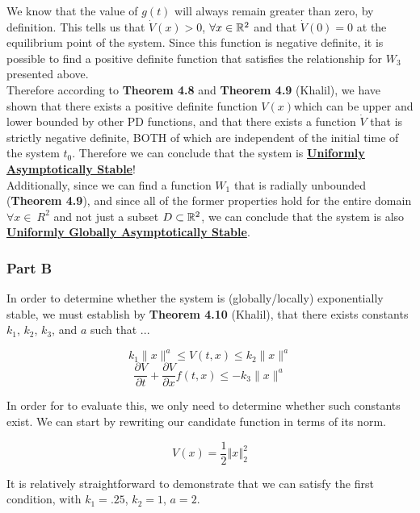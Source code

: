 \noindent We know that the value of $g(t)$ will always remain greater than zero, by definition. This tells us that $\dot{V}(x)>0$, $\forall x \in \mathbb{R}^2 $ and that $\dot{V}(0) = 0$ at the equilibrium point of the system. Since this function is negative definite, it is possible to find a positive definite function that satisfies the relationship for $W_3$ presented above. \\

\noindent Therefore according to \textbf{Theorem 4.8} and \textbf{Theorem 4.9} (Khalil), we have shown that there exists a positive definite function $V(x)$which can be upper and lower bounded by other PD functions, and that there exists a function $\dot{V}$ that is strictly negative definite, BOTH of which are independent of the initial time of the system $t_0$. Therefore we can conclude that the system is \underline{\textbf{Uniformly Asymptotically Stable}}! \\

\noindent Additionally, since we can find a function $W_1$ that is radially unbounded (\textbf{Theorem 4.9}), and since all of the former properties hold for the entire domain $\forall x \in \
R^2$ and not just a subset $D \subset \mathbb{R}^2$, we can conclude that the system is also \underline{\textbf{Uniformly Globally Asymptotically Stable}}.





\subsubsection*{Part B}

In order to determine whether the system is (globally/locally) exponentially stable, we must establish by \textbf{Theorem 4.10} (Khalil), that there exists constants $k_1$, $k_2$, $k_3$, and $a$ such that ...

$$
k_{1}\|x\|^{a} \leq V(t, x) \leq k_{2}\|x\|^{a}
$$
$$
\frac{\partial V}{\partial t}+\frac{\partial V}{\partial x} f(t, x) \leq-k_{3}\|x\|^{a}
$$

\noindent In order for to evaluate this, we only need to determine whether such constants exist. We can start by rewriting our candidate function in terms of its norm.

$$
V(x) = \frac{1}{2} \left\Vert x \right\Vert_2^2
$$

\noindent It is relatively straightforward to demonstrate that we can satisfy the first condition, with $k_1 = .25$, $k_2 = 1$, $a=2$.

